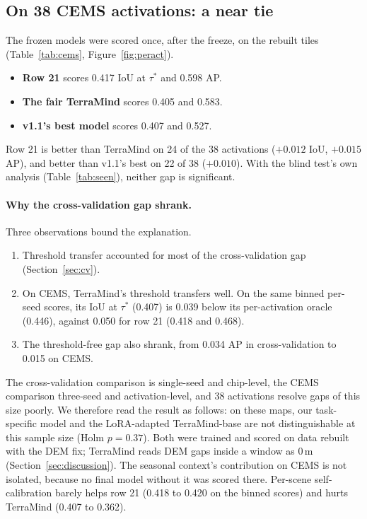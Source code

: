 \documentclass[10pt,twocolumn,a4paper]{article}
\begin{document}
\subsection{On 38 CEMS activations: a near tie}\label{sec:cems}
The frozen models were scored once, after the freeze, on the rebuilt tiles (Table~\ref{tab:cems},
Figure~\ref{fig:peract}).
\begin{itemize}
  \item \textbf{Row 21} scores 0.417 IoU at $\tau^{*}$ and 0.598 AP.
  \item \textbf{The fair TerraMind} scores 0.405 and 0.583.
  \item \textbf{v1.1's best model} scores 0.407 and 0.527.
\end{itemize}
Row 21 is better than TerraMind on 24 of the 38 activations ($+0.012$ IoU, $+0.015$ AP), and better than v1.1's best
on 22 of 38 ($+0.010$). With the blind test's own analysis (Table~\ref{tab:seen}), neither gap is significant.

\paragraph{Why the cross-validation gap shrank.} Three observations bound the explanation.
\begin{enumerate}[label=(\roman*)]
  \item Threshold transfer accounted for most of the cross-validation gap (Section~\ref{sec:cv}).
  \item On CEMS, TerraMind's threshold transfers well. On the same binned per-seed scores, its IoU at $\tau^{*}$
    (0.407) is 0.039 below its per-activation oracle (0.446), against 0.050 for row 21 (0.418 and 0.468).
  \item The threshold-free gap also shrank, from 0.034 AP in cross-validation to 0.015 on CEMS.
\end{enumerate}
The cross-validation comparison is single-seed and chip-level, the CEMS comparison three-seed and activation-level,
and 38 activations resolve gaps of this size poorly. We therefore read the result as follows: on these maps, our
task-specific model and the LoRA-adapted TerraMind-base are not distinguishable at this sample size (Holm $p=0.37$).
Both were trained and scored on data rebuilt with the DEM fix; TerraMind reads DEM gaps inside a window as 0\,m
(Section~\ref{sec:discussion}). The seasonal context's contribution on CEMS is not isolated, because no final model
without it was scored there. Per-scene self-calibration barely helps row 21 (0.418 to 0.420 on the binned scores)
and hurts TerraMind (0.407 to 0.362).
\end{document}

